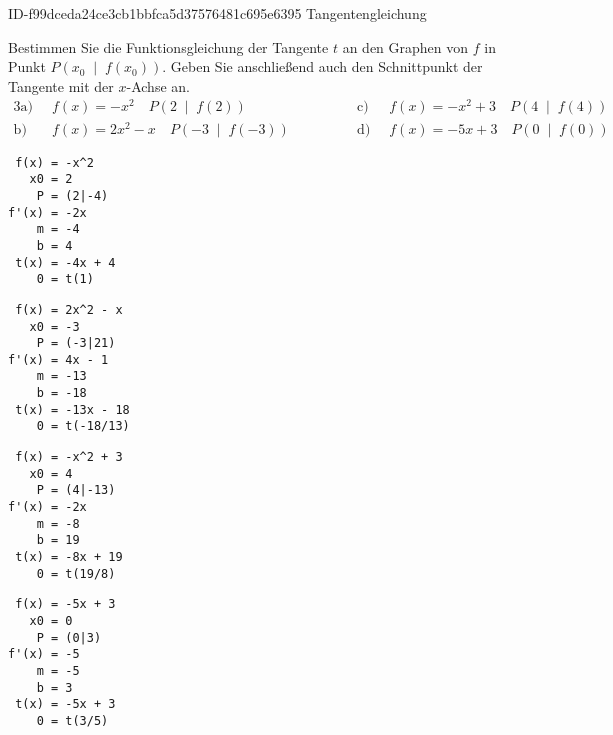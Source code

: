 \begin{exercise}
      {ID-f99dceda24ce3cb1bbfca5d37576481c695e6395}
      {Tangentengleichung}
  \ifproblem\problem\par
    Bestimmen Sie die Funktionsgleichung der
    Tangente $t$ an den Graphen von $f$ in
    Punkt $P\left(x_0\;\middle|\;f(x_0)\right)$.
    Geben Sie anschließend auch den Schnittpunkt
    der Tangente mit der $x$-Achse an.
    \begin{alignat*}{3}
      \text{a)}&\;\;
      f(x)=-x^{2}
      \quad
      P\left(\num{2}\;\middle|\;f(\num{2})\right)
      \qquad&\qquad
      \text{c)}&\;\;
      f(x)=-x^{2}+\num{3}
      \quad
      P\left(\num{4}\;\middle|\;f(\num{4})\right)
      \\[1ex]
      \text{b)}&\;\;
      f(x)=\num{2}x^{2}-x
      \quad
      P\left(-\num{3}\;\middle|\;f(-\num{3})\right)
      \qquad&\qquad
      \text{d)}&\;\;
      f(x)=-\num{5}x+\num{3}
      \quad
      P\left(\num{0}\;\middle|\;f(\num{0})\right)
    \end{alignat*}
  \fi
  \ifoutcome\outcome\par
\begin{minipage}{9em}
\begin{verbatim}
 f(x) = -x^2    
   x0 = 2       
    P = (2|-4)  
f'(x) = -2x     
    m = -4      
    b = 4       
 t(x) = -4x + 4 
    0 = t(1)    
\end{verbatim}
\end{minipage}\hfill
\begin{minipage}{9em}
\begin{verbatim}
 f(x) = 2x^2 - x  
   x0 = -3        
    P = (-3|21)   
f'(x) = 4x - 1    
    m = -13       
    b = -18       
 t(x) = -13x - 18 
    0 = t(-18/13) 
\end{verbatim}
\end{minipage}\hfill
\begin{minipage}{9em}
\begin{verbatim}
 f(x) = -x^2 + 3 
   x0 = 4        
    P = (4|-13)  
f'(x) = -2x      
    m = -8       
    b = 19       
 t(x) = -8x + 19 
    0 = t(19/8)  
\end{verbatim}
\end{minipage}\hfill
\begin{minipage}{9em}
\begin{verbatim}
 f(x) = -5x + 3 
   x0 = 0       
    P = (0|3)   
f'(x) = -5      
    m = -5      
    b = 3       
 t(x) = -5x + 3 
    0 = t(3/5)  
\end{verbatim}
\end{minipage}\par
  \fi
\end{exercise}
